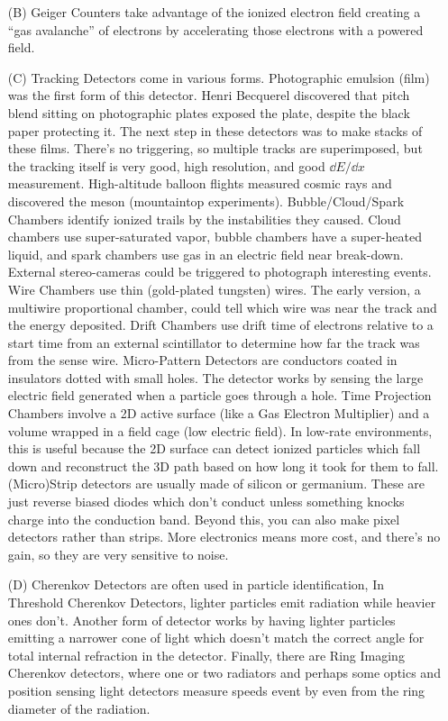 \documentclass[a4paper,twoside,master.tex]{subfiles}
\begin{document}

\begin{itemize}
    \item[(B)] Geiger Counters take advantage of the ionized electron field creating a ``gas avalanche'' of electrons by accelerating those electrons with a powered field.
    \item[(C)] Tracking Detectors come in various forms. Photographic emulsion (film) was the first form of this detector. Henri Becquerel discovered that pitch blend sitting on photographic plates exposed the plate, despite the black paper protecting it. The next step in these detectors was to make stacks of these films. There's no triggering, so multiple tracks are superimposed, but the tracking itself is very good, high resolution, and good $ \dd{E} / \dd{x} $ measurement. High-altitude balloon flights measured cosmic rays and discovered the meson (mountaintop experiments).
    \subitem Bubble/Cloud/Spark Chambers identify ionized trails by the instabilities they caused. Cloud chambers use super-saturated vapor, bubble chambers have a super-heated liquid, and spark chambers use gas in an electric field near break-down. External stereo-cameras could be triggered to photograph interesting events.
    \subitem Wire Chambers use thin (gold-plated tungsten) wires. The early version, a multiwire proportional chamber, could tell which wire was near the track and the energy deposited.
        \subsubitem Drift Chambers use drift time of electrons relative to a start time from an external scintillator to determine how far the track was from the sense wire.
    \subitem Micro-Pattern Detectors are conductors coated in insulators dotted with small holes. The detector works by sensing the large electric field generated when a particle goes through a hole.
    \subitem Time Projection Chambers involve a 2D active surface (like a Gas Electron Multiplier) and a volume wrapped in a field cage (low electric field). In low-rate environments, this is useful because the 2D surface can detect ionized particles which fall down and reconstruct the 3D path based on how long it took for them to fall.
    \subitem (Micro)Strip detectors are usually made of silicon or germanium. These are just reverse biased diodes which don't conduct unless something knocks charge into the conduction band. Beyond this, you can also make pixel detectors rather than strips. More electronics means more cost, and there's no gain, so they are very sensitive to noise.
    \item[(D)] Cherenkov Detectors are often used in particle identification, In Threshold Cherenkov Detectors, lighter particles emit radiation while heavier ones don't. Another form of detector works by having lighter particles emitting a narrower cone of light which doesn't match the correct angle for total internal refraction in the detector. Finally, there are Ring Imaging Cherenkov detectors, where one or two radiators and perhaps some optics and position sensing light detectors measure speeds event by even from the ring diameter of the radiation.

\end{itemize}
\end{document}
